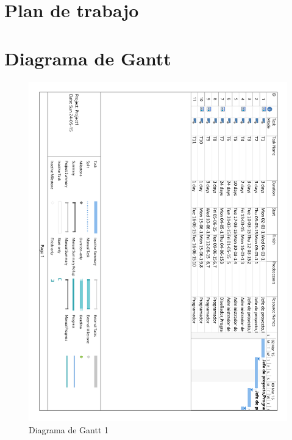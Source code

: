 \clearpage

\section{Plan de trabajo}

\section{Diagrama de Gantt}

\begin{figure}[!htp]
	\centering
	\includegraphics[page=1, scale=.7]{fig/gantt_diagram}
	\caption{Diagrama de Gantt 1}
\end{figure}

